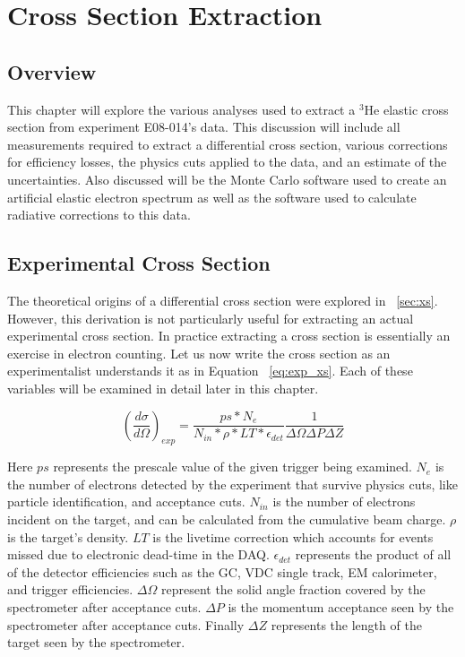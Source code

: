 \chapter{Cross Section Extraction} %
\label{ch:xs}

\section{Overview}
\label{sec:analysis_overview}

This chapter will explore the various analyses used to extract a $^3$He elastic cross section from experiment E08-014's data. This discussion will include all measurements required to extract a differential cross section, various corrections for efficiency losses, the physics cuts applied to the data, and an estimate of the uncertainties. Also discussed will be the Monte Carlo software used to create an artificial elastic electron spectrum as well as the software used to calculate radiative corrections to this data.

\section{Experimental Cross Section}
\label{sec:exp_xs}

The theoretical origins of a differential cross section were explored in ~\ref{sec:xs}. However, this derivation is not particularly useful for extracting an actual experimental cross section. In practice extracting a cross section is essentially an exercise in electron counting. Let us now write the cross section as an experimentalist understands it as in Equation ~\ref{eq:exp_xs}. Each of these variables will be examined in detail later in this chapter.

\begin{equation} \label{eq:exp_xs}
	\left(\frac{d\sigma}{d\Omega}\right)_{exp} = \frac{ps*N_e}{N_{in}*\rho *LT* \epsilon_{det}} \frac{1}{\Delta\Omega\Delta P \Delta Z}
\end{equation}

Here $ps$ represents the prescale value of the given trigger being examined. $N_e$ is the number of electrons detected by the experiment that survive physics cuts, like particle identification, and acceptance cuts. $N_{in}$ is the number of electrons incident on the target, and can be calculated from the cumulative beam charge. $\rho$ is the target's density. $LT$ is the livetime correction which accounts for events missed due to electronic dead-time in the DAQ. $\epsilon_{det}$ represents the product of all of the detector efficiencies such as the GC, VDC single track, EM calorimeter, and trigger efficiencies. $\Delta\Omega$ represent the solid angle fraction covered by the spectrometer after acceptance cuts. $\Delta P$ is the momentum acceptance seen by the spectrometer after acceptance cuts. Finally $\Delta Z$ represents the length of the target seen by the spectrometer.

